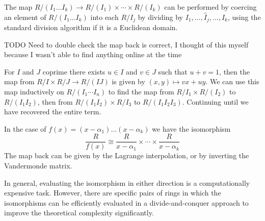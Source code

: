 \medskip

The map $R/(I_1\ldots I_k) \to R/(I_1) \times \cdots \times R/(I_k)$ can be performed by coercing an element of $R/(I_1 \ldots I_k)$ into each $R / I_j$ by dividing by $I_1, \ldots, \hat{I}_j, \ldots, I_k$, using the standard division algorithm if it is a Euclidean domain.

\medskip
TODO Need to double check the map back is correct, I thought of this myself because I wasn't able to find anything online at the time

For $I$ and $J$ coprime there exists $u \in I$ and $v \in J$ such that $u + v = 1$, then the map from $R/I \times R/J \to R/(IJ)$ is given by $(x, y) \mapsto vx + uy$. We can use this map inductively on $R/(I_1\cdots I_n)$ to find the map from $R / I_1 \times R / (I_2)$ to $R / (I_1I_2)$, then from $R / (I_1I_2) \times R / I_3$ to $R / (I_1I_2I_3)$. Continuing until we have recovered the entire term.

In the case of $f(x) = (x - \alpha_1) \ldots (x - \alpha_k)$ we have the isomorphism
\[
    \frac{R}{f(x)} \cong \frac{R}{x - \alpha_1} \times \cdots \times \frac{R}{x - \alpha_k}
\]
The map back can be given by the Lagrange interpolation, or by inverting the Vandermonde matrix.

In general, evaluating the isomorphism in either direction is a computationally expensive task. However, there are specific pairs of rings in which the isomorphisms can be efficiently evaluated in a divide-and-conquer approach to improve the theoretical complexity significantly.
